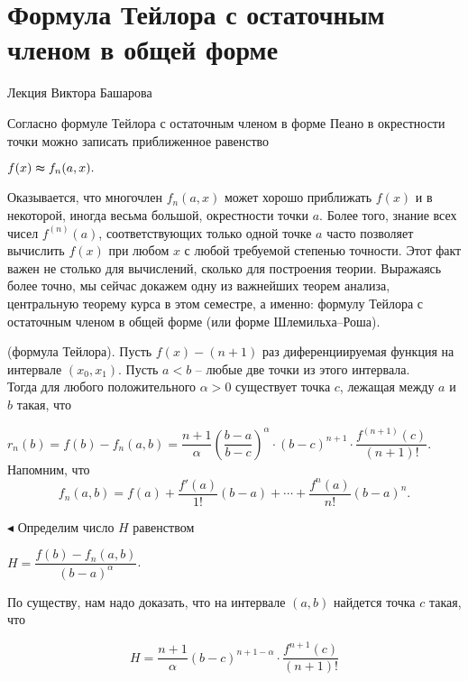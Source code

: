 \chapter{Формула Тейлора с остаточным членом в общей форме} 
\centerline{ Лекция Виктора Башарова}
\vskip 10mm

 Согласно формуле Тейлора с остаточным членом в форме Пеано 
в окрестности точки можно записать приближенное равенство

\vskip 7mm

\centerline{$f(x) \thickapprox f_{n}(a,x).$}

\vskip 7mm
                  
Оказывается, что многочлен $f_{n}(a,x)$ может хорошо приближать $f(x)$ 
и в некоторой, иногда весьма большой, окрестности точки $a$. Более 
того, знание всех чисел $f^{(n)}(a)$, соответствующих только одной точке 
$a$ часто позволяет вычислить $f(x)$ при любом $x$ с любой требуемой 
степенью точности. Этот факт важен не столько для вычислений, 
сколько для построения теории. Выражаясь более точно, мы сейчас 
докажем одну из важнейших теорем анализа, центральную теорему
курса в этом семестре, а именно: формулу Тейлора с остаточным 
членом в общей форме (или форме Шлемильха--Роша). 


\begin{theorem} (формула Тейлора). Пусть $f(x) - (n+1)$ раз диференциируемая функция на интервале $(x_{0},x_{1})$. Пусть $a<b$  -- любые две точки из этого интервала.\\
 Тогда для любого положительного $\alpha > 0$ существует точка $c$, лежащая между $a$ и $b$ такая, что 

$r_{n}(b) = f(b) - f_{n}(a,b) =  \dfrac{n+1}{\alpha} \left(\dfrac{b-a}{b-c}\right)^{\alpha} \cdot (b-c)^{n+1} \cdot \dfrac{f^{(n+1)}(c)}{(n+1)!}$.\\
Напомним, что 
$$f_{n}(a,b) = f(a)+\dfrac{f'(a)}{1!}(b-a)+ \cdots +\dfrac{f^{n}(a)}{n!}(b-a)^n.$$
\end{theorem}
$\blacktriangleleft$ Определим число $H$ равенством

\centerline{$H = \dfrac{f(b)-f_{n}(a,b)}{(b-a)^{\alpha}}$.}


По существу, нам надо доказать, что на интервале $(a,b)$ найдется точка $c$ такая, что 

$$H = \dfrac{n+1}{\alpha}(b-c)^{n+1- \alpha} \cdot \dfrac{f^{n+1}(c)}{(n+1)!}$$

